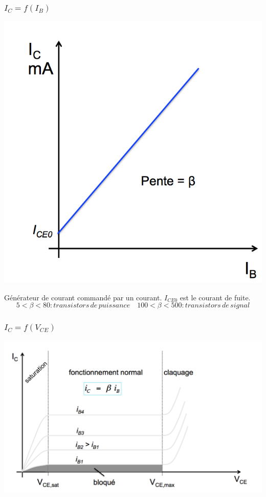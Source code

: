 \documentclass[]{article}
\begin{document}
\subsubsection{$I_C = f(I_B)$}
\includegraphics[scale=0.4]{Ic_Ib.png} 

Générateur de courant commandé par un courant. $I_{CE0}$ est le courant de fuite.
$$ 5< \beta < 80 : transistors\,de\,puissance \quad 100 < \beta < 500 : transistors\,de\,signal $$
\subsubsection{$I_C = f(V_{CE})$}
\includegraphics[scale=0.4]{Ic_Vce.png}
\end{document}

